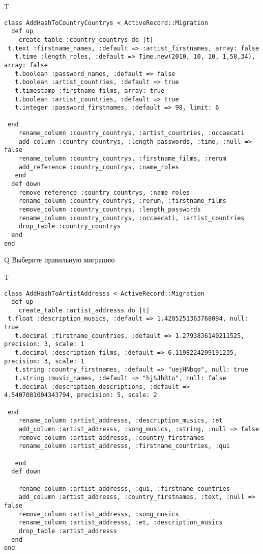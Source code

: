 T
\begin{verbatim}
class AddHashToCountryCountrys < ActiveRecord::Migration
  def up
    create_table :country_countrys do |t|
 t.text :firstname_names, :default => :artist_firstnames, array: false
   t.time :length_roles, :default => Time.new(2010, 10, 10, 1,58,34), array: false
   t.boolean :password_names, :default => false
   t.boolean :artist_countries, :default => true
   t.timestamp :firstname_films, array: true
   t.boolean :artist_countries, :default => true
   t.integer :password_firstnames, :default => 98, limit: 6

 end
    rename_column :country_countrys, :artist_countries, :occaecati
    add_column :country_countrys, :length_passwords, :time, :null => false
    rename_column :country_countrys, :firstname_films, :rerum
    add_reference :country_countrys, :name_roles
   end
  def down
    remove_reference :country_countrys, :name_roles
    rename_column :country_countrys, :rerum, :firstname_films
    remove_column :country_countrys, :length_passwords
    rename_column :country_countrys, :occaecati, :artist_countries
    drop_table :country_countrys
  end
end
\end{verbatim}
Q
Выберите правильную миграцию

T
\begin{verbatim}
class AddHashToArtistAddresss < ActiveRecord::Migration
  def up
    create_table :artist_addresss do |t|
 t.float :description_musics, :default => 1.4205251363768094, null: true
   t.decimal :firstname_countries, :default => 1.2793836140211525, precision: 3, scale: 1
   t.decimal :description_films, :default => 6.1198224299191235, precision: 3, scale: 1
   t.string :country_firstnames, :default => "uejHNbqo", null: true
   t.string :music_names, :default => "hjSJhRto", null: false
   t.decimal :description_descriptions, :default => 4.5407081004343794, precision: 5, scale: 2

 end
    rename_column :artist_addresss, :description_musics, :et
    add_column :artist_addresss, :song_musics, :string, :null => false
    remove_column :artist_addresss, :country_firstnames
    rename_column :artist_addresss, :firstname_countries, :qui

   end
  def down

    rename_column :artist_addresss, :qui, :firstname_countries
    add_column :artist_addresss, :country_firstnames, :text, :null => false
    remove_column :artist_addresss, :song_musics
    rename_column :artist_addresss, :et, :description_musics
    drop_table :artist_addresss
  end
end
\end{verbatim}

